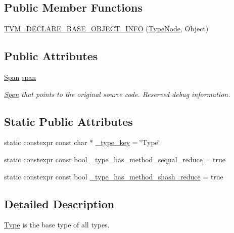 \subsection*{Public Member Functions}
\begin{DoxyCompactItemize}
\item 
\hyperlink{classtvm_1_1TypeNode_abadff70e220806f889e81a0ad3bca0da}{T\+V\+M\+\_\+\+D\+E\+C\+L\+A\+R\+E\+\_\+\+B\+A\+S\+E\+\_\+\+O\+B\+J\+E\+C\+T\+\_\+\+I\+N\+FO} (\hyperlink{classtvm_1_1TypeNode}{Type\+Node}, Object)
\end{DoxyCompactItemize}
\subsection*{Public Attributes}
\begin{DoxyCompactItemize}
\item 
\hyperlink{classtvm_1_1Span}{Span} \hyperlink{classtvm_1_1TypeNode_a7b06d502a5162d51bb205691bbb95bb5}{span}
\begin{DoxyCompactList}\small\item\em \hyperlink{classtvm_1_1Span}{Span} that points to the original source code. Reserved debug information. \end{DoxyCompactList}\end{DoxyCompactItemize}
\subsection*{Static Public Attributes}
\begin{DoxyCompactItemize}
\item 
static constexpr const char $\ast$ \hyperlink{classtvm_1_1TypeNode_afa1561c887198fbf21aaadd4c13eb2c2}{\+\_\+type\+\_\+key} = \char`\"{}Type\char`\"{}
\item 
static constexpr const bool \hyperlink{classtvm_1_1TypeNode_ab02f7d165755f57689f986aca467a7e5}{\+\_\+type\+\_\+has\+\_\+method\+\_\+sequal\+\_\+reduce} = true
\item 
static constexpr const bool \hyperlink{classtvm_1_1TypeNode_a4179c7d7d55d1141cadfd19547fb1344}{\+\_\+type\+\_\+has\+\_\+method\+\_\+shash\+\_\+reduce} = true
\end{DoxyCompactItemize}


\subsection{Detailed Description}
\hyperlink{classtvm_1_1Type}{Type} is the base type of all types. 

